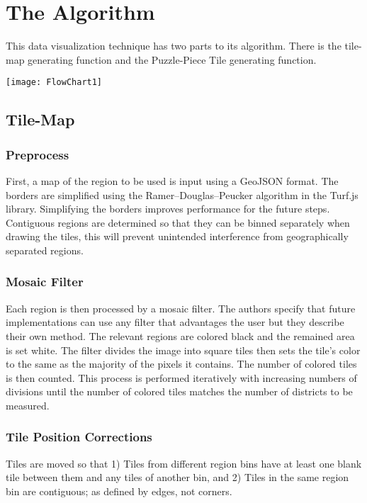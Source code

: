 \documentclass[a4paper,man,natbib]{apa6}
\begin{document}
	\section{The Algorithm}
	This data visualization technique has two parts to its algorithm. There is the tile-map generating function and the Puzzle-Piece Tile generating function.
	
	\begin{minipage}{\linewidth}
		\begin{center}
			\texttt{[image: FlowChart1]}
		\end{center}
	\end{minipage}\vspace{2em}

	\subsection{Tile-Map}
		\subsubsection{Preprocess}
		First, a map of the region to be used is input using a GeoJSON format. The borders are simplified using the Ramer–Douglas–Peucker algorithm in the Turf.js library. Simplifying the borders improves performance for the future steps. Contiguous regions are determined so that they can be binned separately when drawing the tiles, this will prevent unintended interference from geographically separated regions.
		\subsubsection{Mosaic Filter}
		Each region is then processed by a mosaic filter. The authors specify that future implementations can use any filter that advantages the user but they describe their own method. The relevant regions are colored black and the remained area is set white. The filter divides the image into square tiles then sets the tile's color to the same as the majority of the pixels it contains. The number of colored tiles is then counted. This process is performed iteratively with increasing numbers of divisions until the number of colored tiles matches the number of districts to be measured. 
		\subsubsection{Tile Position Corrections}
		Tiles are moved so that 
		1) Tiles from different region bins have at least one blank tile between them and any tiles of another bin, and 
		2) Tiles in the same region bin are contiguous; as defined by edges, not corners.
\end{document}
